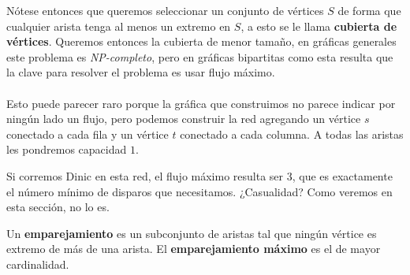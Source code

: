 Nótese entonces que queremos seleccionar un conjunto de vértices $S$ de forma que cualquier arista tenga al menos un extremo en $S$, a esto se le llama \textbf{cubierta de vértices}. Queremos entonces la cubierta de menor tamaño, en gráficas generales este problema es \textit{NP-completo}, pero en gráficas bipartitas como esta resulta que la clave para resolver el problema es usar flujo máximo.
\\\\Esto puede parecer raro porque la gráfica que construimos no parece indicar por ningún lado un flujo, pero podemos construir la red agregando un vértice $s$ conectado a cada fila y un vértice $t$ conectado a cada columna. A todas las aristas les pondremos capacidad $1$.
\begin{figure}[H]
\centering
{}
\end{figure}
Si corremos Dinic en esta red, el flujo máximo resulta ser 3, que es
exactamente el número mínimo de disparos que necesitamos. ¿Casualidad? Como veremos en esta sección, no lo es.

\begin{definition}Un \textbf{emparejamiento} es un subconjunto de aristas tal que ningún vértice es extremo de más de una arista. El \textbf{emparejamiento máximo} es el de mayor cardinalidad.
\end{definition}
 

